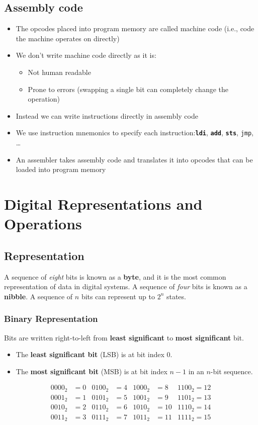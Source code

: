 \documentclass[a4paper]{report}
\newcommand{\keywordinline}[1]{\textcolor[rgb]{0.00,0.50,0.00}{\textbf{\texttt{#1}}}}
\begin{document}
\section{Assembly code}
\begin{itemize}
    \item The opcodes placed into program memory are called
          machine code (i.e., code the machine operates on directly)
    \item We don't write machine code directly as it is:
          \begin{itemize}
              \item Not human readable
              \item Prone to errors (swapping a single bit can completely change the operation)
          \end{itemize}
    \item Instead we can write instructions directly in assembly code
    \item We use instruction mnemonics to specify each instruction:\@ \keywordinline{ldi}, \keywordinline{add}, \keywordinline{sts}, \texttt{jmp}, \dots
    \item An assembler takes assembly code and translates it into opcodes that can
          be loaded into program memory
\end{itemize}
\chapter{Digital Representations and Operations}
\section{Representation}
A sequence of \textit{eight} bits is known as a \textbf{byte}, and it is the most
common representation of data in digital systems.
A sequence of \textit{four} bits is known as a \textbf{nibble}.
A sequence of \(n\) bits can represent up to \(2^n\) states.
\subsection{Binary Representation}
Bits are written right-to-left from \textbf{least significant} to \textbf{most significant} bit.
\begin{itemize}
    \item The \textbf{least significant bit} (LSB) is at bit index 0.
    \item The \textbf{most significant bit} (MSB) is at bit index \(n - 1\) in an \(n\)-bit sequence.
\end{itemize}
\begin{align*}
    0000_2 & = 0 & 0100_2 & = 4 & 1000_2 & = 8  & 1100_2 = 12 \\
    0001_2 & = 1 & 0101_2 & = 5 & 1001_2 & = 9  & 1101_2 = 13 \\
    0010_2 & = 2 & 0110_2 & = 6 & 1010_2 & = 10 & 1110_2 = 14 \\
    0011_2 & = 3 & 0111_2 & = 7 & 1011_2 & = 11 & 1111_2 = 15
\end{align*}
\end{document}
